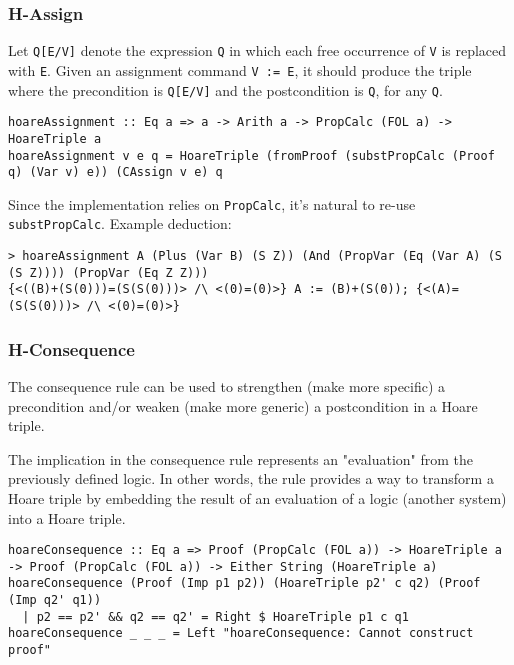 \documentclass{article}
\begin{document}
\subsubsection{H-Assign}

Let \texttt{Q[E/V]} denote the expression \texttt{Q} in which each free occurrence of \texttt{V} is replaced with \texttt{E}. Given an assignment command \texttt{V := E}, it should produce the triple where the precondition is \texttt{Q[E/V]} and the postcondition is \texttt{Q}, for any \texttt{Q}.

\begin{lstlisting}
hoareAssignment :: Eq a => a -> Arith a -> PropCalc (FOL a) -> HoareTriple a
hoareAssignment v e q = HoareTriple (fromProof (substPropCalc (Proof q) (Var v) e)) (CAssign v e) q
\end{lstlisting}

Since the implementation relies on \texttt{PropCalc}, it's natural to re-use \texttt{substPropCalc}. Example deduction:

\begin{lstlisting}
> hoareAssignment A (Plus (Var B) (S Z)) (And (PropVar (Eq (Var A) (S (S Z)))) (PropVar (Eq Z Z)))
{<((B)+(S(0)))=(S(S(0)))> /\ <(0)=(0)>} A := (B)+(S(0)); {<(A)=(S(S(0)))> /\ <(0)=(0)>}
\end{lstlisting}

\subsubsection{H-Consequence}

The consequence rule can be used to strengthen (make more specific) a precondition and/or weaken (make more generic) a postcondition in a Hoare triple.

The implication in the consequence rule represents an "evaluation" from the previously defined logic. In other words, the rule provides a way to transform a Hoare triple by embedding the result of an evaluation of a logic (another system) into a Hoare triple.

\begin{lstlisting}
hoareConsequence :: Eq a => Proof (PropCalc (FOL a)) -> HoareTriple a -> Proof (PropCalc (FOL a)) -> Either String (HoareTriple a)
hoareConsequence (Proof (Imp p1 p2)) (HoareTriple p2' c q2) (Proof (Imp q2' q1))
  | p2 == p2' && q2 == q2' = Right $ HoareTriple p1 c q1
hoareConsequence _ _ _ = Left "hoareConsequence: Cannot construct proof"
\end{lstlisting}
\end{document}
